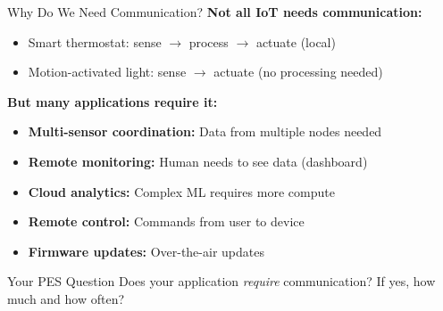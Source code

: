 \documentclass[aspectratio=169,11pt]{beamer}
\begin{document}
\begin{frame}{Why Do We Need Communication?}
    \textbf{Not all IoT needs communication:}
    \begin{itemize}
        \item Smart thermostat: sense $\rightarrow$ process $\rightarrow$ actuate (local)
        \item Motion-activated light: sense $\rightarrow$ actuate (no processing needed)
    \end{itemize}
    
    \vspace{0.3cm}
    \textbf{But many applications require it:}
    \begin{itemize}
        \item \textbf{Multi-sensor coordination:} Data from multiple nodes needed
        \item \textbf{Remote monitoring:} Human needs to see data (dashboard)
        \item \textbf{Cloud analytics:} Complex ML requires more compute
        \item \textbf{Remote control:} Commands from user to device
        \item \textbf{Firmware updates:} Over-the-air updates
    \end{itemize}
    
    \vspace{0.3cm}
    \begin{block}{Your PES Question}
        Does your application \textit{require} communication? If yes, how much and how often?
    \end{block}
\end{frame}
\end{document}
